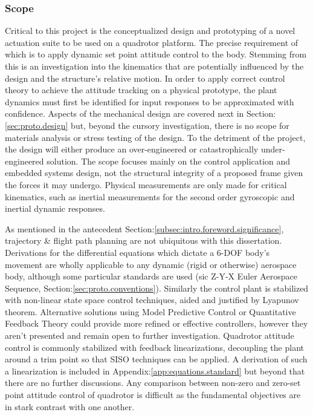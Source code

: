 \subsubsection{Scope}
\label{subsubsec:intro.foreword.scope}
Critical to this project is the conceptualized design and prototyping of a novel actuation suite to be used on a quadrotor platform. The precise requirement of which is to apply dynamic set point attitude control to the body. Stemming from this is an investigation into the kinematics that are potentially influenced by the design and the structure's relative motion. In order to apply correct control theory to achieve the attitude tracking on a physical prototype, the plant dynamics must first be identified for input responses to be approximated with confidence. Aspects of the mechanical design are covered next in Section:\ref{sec:proto.design} but, beyond the cursory investigation, there is no scope for materials analysis or stress testing of the design. To the detriment of the project, the design will either produce an over-engineered or catastrophically under-engineered solution. The scope focuses mainly on the control application and embedded systems design, not the structural integrity of a proposed frame given the forces it may undergo. Physical measurements are only made for critical kinematics, such as inertial measurements for the second order gyroscopic and inertial dynamic responses.
\par
As mentioned in the antecedent Section:\ref{subsec:intro.foreword.significance}, trajectory \& flight path planning are not ubiquitous with this dissertation. Derivations for the differential equations which dictate a 6-DOF body's movement are wholly applicable to any dynamic (rigid or otherwise) aerospace body, although some particular standards are used (sic Z-Y-X Euler Aerospace Sequence, Section:\ref{sec:proto.conventions}). Similarly the control plant is stabilized with non-linear state space control techniques, aided and justified by Lyapunov theorem. Alternative solutions using Model Predictive Control or Quantitative Feedback Theory could provide more refined or effective controllers, however they aren't presented and remain open to further investigation. Quadrotor attitude control is commonly stabilized with feedback linearizations, decoupling the plant around a trim point so that SISO techniques can be applied. A derivation of such a linearization is included in Appendix:\ref{app:equations.standard} but beyond that there are no further discussions. Any comparison between non-zero and zero-set point attitude control of quadrotor is difficult as the fundamental objectives are in stark contrast with one another.
